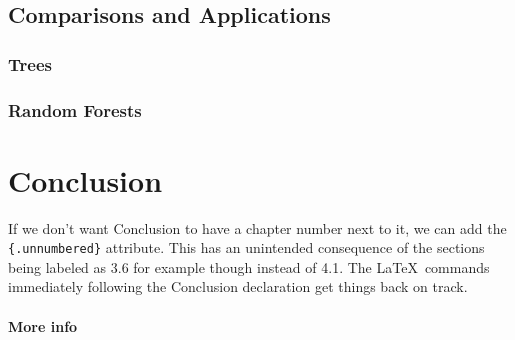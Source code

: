 \documentclass[12pt,twoside]{reedthesis}
\begin{document}
  \section{Comparisons and
  Applications}\label{comparisons-and-applications}
  
  \subsection{Trees}\label{trees-1}
  
  \begin{Shaded}
  \begin{Highlighting}[]
  \StringTok{ }
  \NormalTok{(}\NormalTok{(}  \StringTok{ }
  \StringTok{  }\NormalTok{(} \NormalTok{thesis[}\NormalTok{], } \NormalTok{) +}
  \StringTok{  }\NormalTok{(}\NormalTok{)+}
  \StringTok{  }\NormalTok{(} \NormalTok{inft[}\NormalTok{,}\NormalTok{])}
  \end{Highlighting}
  \end{Shaded}
  
  \subsection{Random Forests}\label{random-forests-1}
  
  \chapter*{Conclusion}\label{conclusion}
  
  \setcounter{chapter}{4} \setcounter{section}{0}
  
  If we don't want Conclusion to have a chapter number next to it, we can
  add the \texttt{\{.unnumbered\}} attribute. This has an unintended
  consequence of the sections being labeled as 3.6 for example though
  instead of 4.1. The \LaTeX~commands immediately following the Conclusion
  declaration get things back on track.
  
  \subsubsection{More info}\label{more-info}
  
\end{document}
